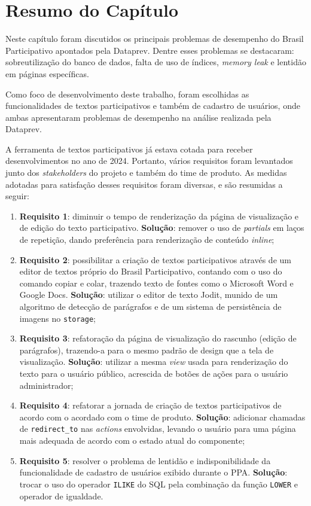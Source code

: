 \section {Resumo do Capítulo}
\label{sec:desenvolvimento-resumo-do-capitulo}

Neste capítulo foram discutidos os principais problemas de desempenho do Brasil Participativo apontados pela Dataprev. Dentre esses problemas se destacaram: sobreutilização do banco de dados, falta de uso de índices, \textit{memory leak} e lentidão em páginas específicas.

Como foco de desenvolvimento deste trabalho, foram escolhidas as funcionalidades de textos participativos e também de cadastro de usuários, onde ambas apresentaram problemas de desempenho na análise realizada pela Dataprev.

A ferramenta de textos participativos já estava cotada para receber desenvolvimentos no ano de 2024.
Portanto, vários requisitos foram levantados junto dos \textit{stakeholders} do projeto e também do time de produto.
As medidas adotadas para satisfação desses requisitos foram diversas, e são resumidas a seguir:

\begin{enumerate}
  \item \textbf{Requisito 1}: diminuir o tempo de renderização da página de visualização e de edição do texto
participativo. \textbf{Solução}: remover o uso de \textit{partials} em laços de repetição, dando preferência para renderização de conteúdo \textit{inline};
  \item \textbf{Requisito 2}: possibilitar a criação de textos participativos através de um editor de textos próprio do Brasil Participativo, contando com o uso do comando copiar e colar, trazendo texto de fontes como o Microsoft Word e Google Docs. \textbf{Solução}: utilizar o editor de texto Jodit, munido de um algoritmo de detecção de parágrafos e de um sistema de persistência de imagens no \texttt{storage};
  \item \textbf{Requisito 3}: refatoração da página de visualização do rascunho (edição de parágrafos), trazendo-a para o mesmo padrão de design que a tela de visualização. \textbf{Solução}: utilizar a mesma \textit{view} usada para renderização do texto para o usuário público, acrescida de botões de ações para o usuário administrador;
  \item \textbf{Requisito 4}: refatorar a jornada de criação de textos participativos de acordo com o acordado com o time de produto. \textbf{Solução}: adicionar chamadas de \texttt{redirect\_to} nas \textit{actions} envolvidas, levando o usuário para uma página mais adequada de acordo com o estado atual do componente;
  \item \textbf{Requisito 5}: resolver o problema de lentidão e indisponibilidade da funcionalidade de cadastro de usuários exibido durante o PPA. \textbf{Solução}: trocar o uso do operador \texttt{ILIKE} do SQL pela combinação da função \texttt{LOWER} e operador de igualdade.
\end{enumerate}


